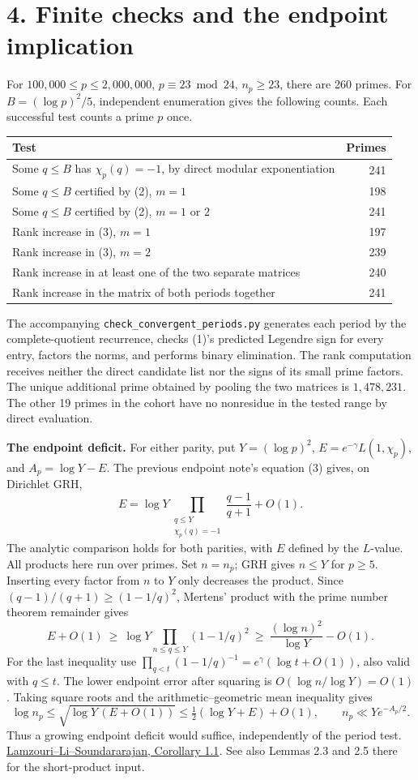 \documentclass[11pt]{article}
\newcommand{\ch}{\chi_p}
\newcommand{\lls}{\href{https://arxiv.org/pdf/1309.3595}{Lamzouri--Li--Soundararajan, Corollary 1.1}}
\begin{document}
\newpage
\section*{4. Finite checks and the endpoint implication}
For \(100{,}000\le p\le2{,}000{,}000\), \(p\equiv23\bmod24\), \(n_p\ge23\),
there are 260 primes. For \(B=(\log p)^2/5\), independent enumeration gives
the following counts. Each successful test counts a prime \(p\) once.
\begin{center}
\begin{tabular}{lr}
Test & Primes\\ \hline
Some \(q\le B\) has \(\ch(q)=-1\), by direct modular exponentiation & 241\\
Some \(q\le B\) certified by (2), \(m=1\) & 198\\
Some \(q\le B\) certified by (2), \(m=1\) or \(2\) & 241\\
Rank increase in (3), \(m=1\) & 197\\
Rank increase in (3), \(m=2\) & 239\\
Rank increase in at least one of the two separate matrices & 240\\
Rank increase in the matrix of both periods together & 241
\end{tabular}
\end{center}
The accompanying \texttt{check\_convergent\_periods.py} generates each period
by the complete-quotient recurrence, checks (1)'s predicted Legendre sign
for every entry, factors the norms, and performs binary elimination. The
rank computation receives neither the direct candidate list nor the signs
of its small prime factors. The unique additional prime obtained by pooling
the two matrices is \(1{,}478{,}231\). The other 19 primes in the cohort
have no nonresidue in the tested range by direct evaluation.

\textbf{The endpoint deficit.} For either parity, put \(Y=(\log p)^2\),
\(E=e^{-\gamma}L(1,\ch)\), and \(A_p=\log Y-E\). The previous endpoint
note's equation (3) gives, on Dirichlet GRH,
\[
 E=\log Y\prod_{\substack{q\le Y\\ \ch(q)=-1}}\frac{q-1}{q+1}+O(1).
\]
The analytic comparison holds for both parities, with \(E\) defined by the
\(L\)-value. All products here run over primes. Set \(n=n_p\); GRH gives
\(n\le Y\) for \(p\ge5\). Inserting every factor from \(n\) to \(Y\) only
decreases the product. Since \((q-1)/(q+1)\ge(1-1/q)^2\), Mertens'
product with the prime number theorem remainder gives
\[
 E+O(1)\ \ge\ \log Y\prod_{n\le q\le Y}(1-1/q)^2
 \ \ge\ \frac{(\log n)^2}{\log Y}-O(1).
\]
For the last inequality use \(\prod_{q<t}(1-1/q)^{-1}
=e^\gamma(\log t+O(1))\), also valid with \(q\le t\).
The lower endpoint error after squaring is \(O(\log n/\log Y)=O(1)\).
Taking square roots and the arithmetic--geometric mean inequality gives
\[
 \log n_p\le\sqrt{\log Y\,(E+O(1))}
 \le \tfrac12(\log Y+E)+O(1),\qquad n_p\ll Y e^{-A_p/2}.
\]
Thus a growing endpoint deficit would suffice, independently of the period
test. \lls. See also Lemmas 2.3 and 2.5 there for the short-product input.
\end{document}

